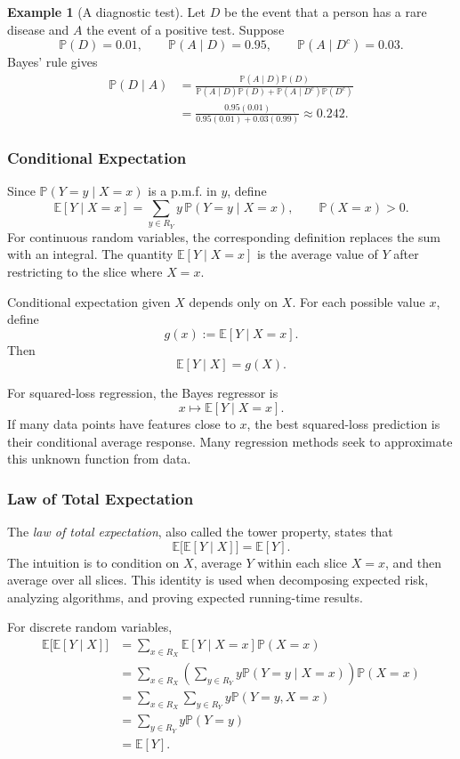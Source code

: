 \documentclass[12pt,oneside]{book}
\numberwithin{equation}{section}
\theoremstyle{definition}
\newtheorem{example}{Example}[section]
\theoremstyle{plain}
\theoremstyle{remark}
\newcommand{\E}{\mathbb{E}}
\begin{document}
\begin{example}[A diagnostic test]
Let $D$ be the event that a person has a rare disease and $A$ the event of a positive test. Suppose
\[
\mathbb{P}(D)=0.01,
\qquad
\mathbb{P}(A\mid D)=0.95,
\qquad
\mathbb{P}(A\mid D^c)=0.03.
\]
Bayes' rule gives
\begin{align*}
\mathbb{P}(D\mid A)
&=\frac{\mathbb{P}(A\mid D)\mathbb{P}(D)}
{\mathbb{P}(A\mid D)\mathbb{P}(D)
+\mathbb{P}(A\mid D^c)\mathbb{P}(D^c)}\\
&=\frac{0.95(0.01)}{0.95(0.01)+0.03(0.99)}
\approx0.242.
\end{align*}
\end{example}

\subsubsection{Conditional Expectation}
Since $\mathbb{P}(Y=y\mid X=x)$ is a p.m.f. in $y$, define
\[
\E[Y\mid X=x]
=\sum_{y\in R_Y}y\,\mathbb{P}(Y=y\mid X=x),
\qquad \mathbb{P}(X=x)>0.
\]
For continuous random variables, the corresponding definition replaces the sum with an integral. The quantity $\E[Y\mid X=x]$ is the average value of $Y$ after restricting to the slice where $X=x$.

Conditional expectation given $X$ depends only on $X$. For each possible value $x$, define
\[
g(x):=\E[Y\mid X=x].
\]
Then
\[
\E[Y\mid X]=g(X).
\]

For squared-loss regression, the Bayes regressor is
\[
x\longmapsto\E[Y\mid X=x].
\]
If many data points have features close to $x$, the best squared-loss prediction is their conditional average response. Many regression methods seek to approximate this unknown function from data.

\subsubsection{Law of Total Expectation}
The \emph{law of total expectation}, also called the tower property, states that
\[
\E\bigl[\E[Y\mid X]\bigr]=\E[Y].
\]
The intuition is to condition on $X$, average $Y$ within each slice $X=x$, and then average over all slices. This identity is used when decomposing expected risk, analyzing algorithms, and proving expected running-time results.

For discrete random variables,
\begin{align*}
\E\bigl[\E[Y\mid X]\bigr]
&=\sum_{x\in R_X}\E[Y\mid X=x]\mathbb{P}(X=x)\\
&=\sum_{x\in R_X}
\left(\sum_{y\in R_Y}y\mathbb{P}(Y=y\mid X=x)\right)
\mathbb{P}(X=x)\\
&=\sum_{x\in R_X}\sum_{y\in R_Y}
y\mathbb{P}(Y=y,X=x)\\
&=\sum_{y\in R_Y}y\mathbb{P}(Y=y)\\
&=\E[Y].
\end{align*}
\end{document}
